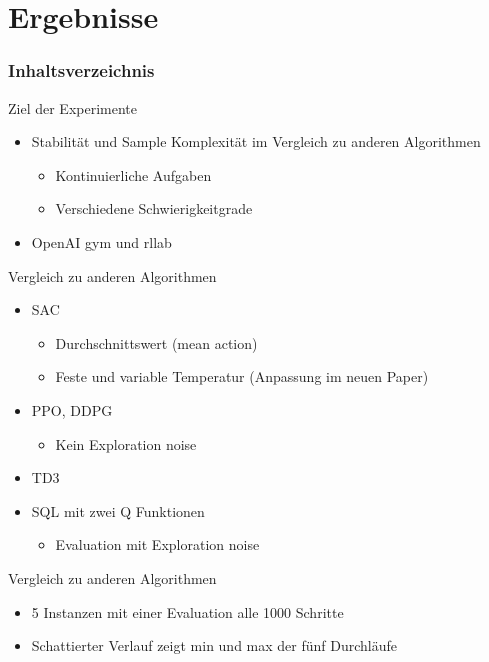 \section{Ergebnisse}
\begin{frame}
    \frametitle{Inhaltsverzeichnis}
    \tableofcontents[currentsection]
\end{frame}

\begin{frame}{Ziel der Experimente}
        \begin{itemize}
            \item Stabilität und Sample Komplexität im Vergleich zu anderen Algorithmen
            \begin{itemize}
                \item Kontinuierliche Aufgaben
                \item Verschiedene Schwierigkeitgrade
            \end{itemize}  
            \item OpenAI gym und rllab
        \end{itemize}
\end{frame}

\begin{frame}{Vergleich zu anderen Algorithmen}
    \begin{itemize}
        \item SAC
        \begin{itemize}
            \item Durchschnittswert (mean action)
            \item Feste und variable Temperatur (Anpassung im neuen Paper)
        \end{itemize} 
        \item PPO, DDPG
        \begin{itemize}
            \item Kein Exploration noise
        \end{itemize}
        \item TD3
        \item SQL mit zwei Q Funktionen
        \begin{itemize}
            \item Evaluation mit Exploration noise        
        \end{itemize}
    \end{itemize}
\end{frame}

\begin{frame}{Vergleich zu anderen Algorithmen}
    \begin{itemize}     
        \item 5 Instanzen mit einer Evaluation alle 1000 Schritte
        \item Schattierter Verlauf zeigt min und max der fünf Durchläufe
    \end{itemize}
    
\end{frame}

